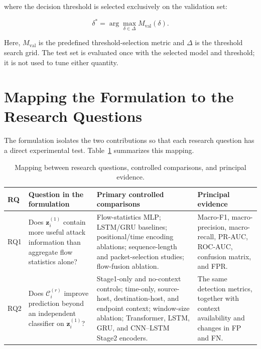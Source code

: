 \documentclass[11pt,fleqn]{report}
\begin{document}
where the decision threshold is selected exclusively on the validation set:

\begin{equation}
\delta^{*}
=
\arg\max_{\delta\in\Delta}
M_{\mathrm{val}}(\delta).
\end{equation}

Here, $M_{\mathrm{val}}$ is the predefined threshold-selection metric and
$\Delta$ is the threshold search grid. The test set is evaluated once with the
selected model and threshold; it is not used to tune either quantity.

\section{Mapping the Formulation to the Research Questions}
\label{subsec:rq_mapping}

The formulation isolates the two contributions so that each research question
has a direct experimental test. Table~\ref{tab:rq_mapping} summarizes this
mapping.

\begin{table}[t]
\centering
\caption{Mapping between research questions, controlled comparisons, and
principal evidence.}
\label{tab:rq_mapping}
\small
\setlength{\tabcolsep}{5pt}
\renewcommand{\arraystretch}{1.15}
\begin{tabular}{@{}p{1.1cm}p{5.0cm}p{5.2cm}p{4.2cm}@{}}
\toprule
\textbf{RQ} & \textbf{Question in the formulation} & \textbf{Primary controlled comparisons} & \textbf{Principal evidence} \\
\midrule
RQ1 & Does $\mathbf{z}^{(1)}_i$ contain more useful attack information than aggregate flow statistics alone? & Flow-statistics MLP; LSTM/GRU baselines; positional/time encoding ablations; sequence-length and packet-selection studies; flow-fusion ablation. & Macro-F1, macro-precision, macro-recall, PR-AUC, ROC-AUC, confusion matrix, and FPR. \\
RQ2 & Does $\mathcal{C}^{(r)}_i$ improve prediction beyond an independent classifier on $\mathbf{z}^{(1)}_i$? & Stage1-only and no-context controls; time-only, source-host, destination-host, and endpoint context; window-size ablation; Transformer, LSTM, GRU, and CNN--LSTM Stage2 encoders. & The same detection metrics, together with context availability and changes in FP and FN. \\
\bottomrule
\end{tabular}
\end{table}
\end{document}
